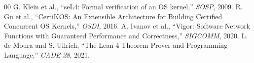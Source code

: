 \documentclass[10pt,journal,compsoc]{IEEEtran}
\begin{document}
\begin{thebibliography}{00}
 G. Klein et al., ``seL4: Formal verification of an OS kernel,'' \textit{SOSP}, 2009.
 R. Gu et al., ``CertiKOS: An Extensible Architecture for Building Certified Concurrent OS Kernels,'' \textit{OSDI}, 2016.
 A. Ivanov et al., ``Vigor: Software Network Functions with Guaranteed Performance and Correctness,'' \textit{SIGCOMM}, 2020.
 L. de Moura and S. Ullrich, ``The Lean 4 Theorem Prover and Programming Language,'' \textit{CADE 28}, 2021.
\end{thebibliography}
\end{document}

